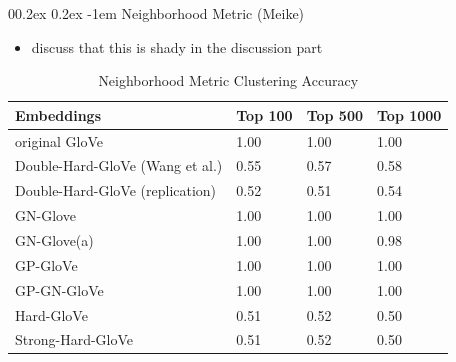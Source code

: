 \documentclass[
  english,
  man,floatsintext]{apa6}
\makeatletter
\providecommand{\tightlist}{%
  \setlength{\itemsep}{0pt}\setlength{\parskip}{0pt}}
\let\oldparagraph\paragraph
\renewcommand{\paragraph}[1]{\oldparagraph{#1}\mbox{}}
\renewcommand{\paragraph}{\@startsection{paragraph}{4}{\parindent}%
  {0\baselineskip \@plus 0.2ex \@minus 0.2ex}%
  {-1em}%
  {\normalfont\normalsize\bfseries\itshape\typesectitle}}
\makeatother
\begin{document}
\hypertarget{neighborhood-metric-meike}{%
\paragraph{Neighborhood Metric (Meike)}\label{neighborhood-metric-meike}}

\begin{itemize}
\tightlist
\item
  discuss that this is shady in the discussion part
\end{itemize}

\begin{table}[tbp]

\begin{center}
\begin{threeparttable}

\caption{\label{tab:table 2}Neighborhood Metric Clustering Accuracy}

\begin{tabular}{llll}
\toprule
Embeddings & Top 100 & Top 500 & Top 1000\\
\midrule
original GloVe & 1.00 & 1.00 & 1.00\\
Double-Hard-GloVe (Wang et al.) & 0.55 & 0.57 & 0.58\\
Double-Hard-GloVe (replication) & 0.52 & 0.51 & 0.54\\
GN-Glove & 1.00 & 1.00 & 1.00\\
GN-Glove(a) & 1.00 & 1.00 & 0.98\\
GP-GloVe & 1.00 & 1.00 & 1.00\\
GP-GN-GloVe & 1.00 & 1.00 & 1.00\\
Hard-GloVe & 0.51 & 0.52 & 0.50\\
Strong-Hard-GloVe & 0.51 & 0.52 & 0.50\\
\bottomrule
\end{tabular}

\end{threeparttable}
\end{center}

\end{table}
\end{document}
